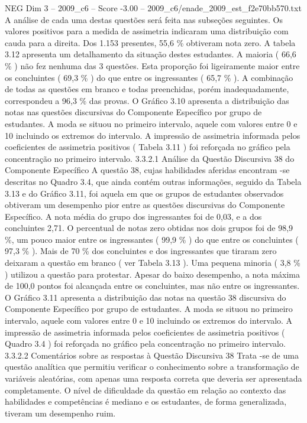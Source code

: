 \begin{textsample}{NEG Dim 3 – 2009\_c6 – Score -3.00 – 2009\_c6/enade\_2009\_est\_f2e70bb570.txt}
A análise de cada uma destas questões será feita nas subseções seguintes.
Os valores positivos para a medida de assimetria indicaram uma distribuição com cauda para a direita.
Dos 1.153 presentes, 55,6 \% obtiveram nota zero.
A tabela 3.12 apresenta um detalhamento da situação destes estudantes.
A maioria ( 66,6 \% ) não fez nenhuma das 3 questões.
Esta proporção foi ligeiramente maior entre os concluintes ( 69,3 \% ) do que entre os ingressantes ( 65,7 \% ).
A combinação de todas as questões em branco e todas preenchidas, porém inadequadamente, correspondeu a 96,3 \% das provas.
O Gráfico 3.10 apresenta a distribuição das notas nas questões discursivas do Componente Específico por grupo de estudantes.
A moda se situou no primeiro intervalo, aquele com valores entre 0 e 10 incluindo os extremos do intervalo.
A impressão de assimetria informada pelos coeficientes de assimetria positivos ( Tabela 3.11 ) foi reforçada no gráfico pela concentração no primeiro intervalo. 3.3.2.1 Análise da Questão Discursiva 38 do Componente Específico A questão 38, cujas habilidades aferidas encontram -se descritas no Quadro 3.4, que ainda contém outras informações, seguido da Tabela 3.13 e do Gráfico 3.11, foi aquela em que os grupos de estudantes observados obtiveram um desempenho pior entre as questões discursivas do Componente Específico.
A nota média do grupo dos ingressantes foi de 0,03, e a dos concluintes 2,71.
O percentual de notas zero obtidas nos dois grupos foi de 98,9 \%, um pouco maior entre os ingressantes ( 99,9 \% ) do que entre os concluintes ( 97,3 \% ).
Mais de 70 \% dos concluintes e dos ingressantes que tiraram zero deixaram a questão em branco ( ver Tabela 3.13 ).
Uma pequena minoria ( 3,8 \% ) utilizou a questão para protestar.
Apesar do baixo desempenho, a nota máxima de 100,0 pontos foi alcançada entre os concluintes, mas não entre os ingressantes.
O Gráfico 3.11 apresenta a distribuição das notas na questão 38 discursiva do Componente Específico por grupo de estudantes.
A moda se situou no primeiro intervalo, aquele com valores entre 0 e 10 incluindo os extremos do intervalo.
A impressão de assimetria informada pelos coeficientes de assimetria positivos ( Quadro 3.4 ) foi reforçada no gráfico pela concentração no primeiro intervalo. 3.3.2.2 Comentários sobre as respostas à Questão Discursiva 38 Trata -se de uma questão analítica que permitiu verificar o conhecimento sobre a transformação de variáveis aleatórias, com apenas uma resposta correta que deveria ser apresentada completamente.
O nível de dificuldade da questão em relação ao contexto das habilidades e competências é mediano e os estudantes, de forma generalizada, tiveram um desempenho ruim.

\end{textsample}
